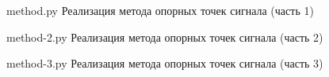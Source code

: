\begin{appendices}
	\chapter{}

    {method.py}
    {Реализация метода опорных точек сигнала (часть 1)}

		{method-2.py}
		{Реализация метода опорных точек сигнала (часть 2)}

	\clearpage

		{method-3.py}
		{Реализация метода опорных точек сигнала (часть 3)}

	\chapter{}
\end{appendices}